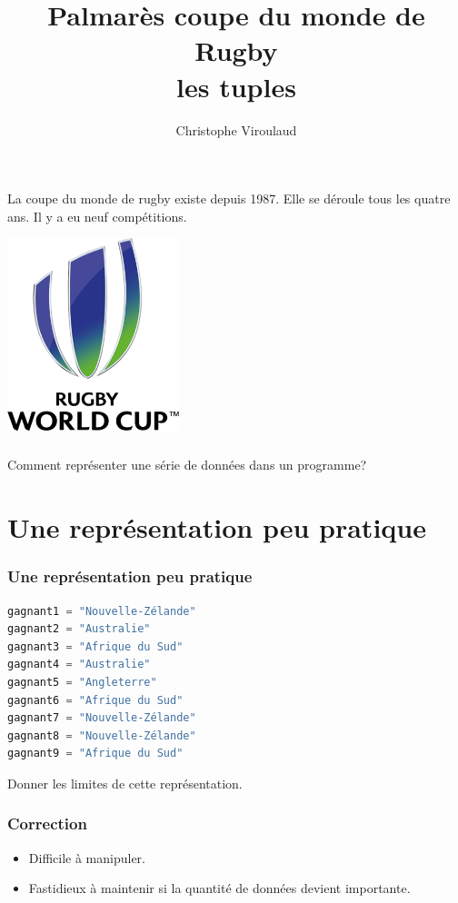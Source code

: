 \documentclass[svgnames,11pt]{beamer}
\author[]{Christophe Viroulaud}
\title{Palmarès coupe du monde de Rugby\\les tuples}
\date{\framebox{\textbf{DonRep 06}}}
\institute{Terminale - NSI}
\begin{document}
\begin{frame}
\titlepage
\end{frame}
\begin{frame}
    \frametitle{}

La coupe du monde de rugby existe depuis 1987. Elle se déroule tous les quatre ans. Il y a eu neuf compétitions.
\begin{center}
\includegraphics[width=5cm]{ressources/rugby.png}
\end{center}

\end{frame}
\begin{frame}
    \frametitle{}

    \begin{framed}
        \centering Comment représenter une série de données dans un programme?
    \end{framed}

\end{frame}
\section{Une représentation peu pratique}
\begin{frame}[fragile]
    \frametitle{Une représentation peu pratique}

\begin{center}
\begin{lstlisting}[language=Python , basicstyle=\ttfamily\small, xleftmargin=2em, xrightmargin=2em]
gagnant1 = "Nouvelle-Zélande"
gagnant2 = "Australie"
gagnant3 = "Afrique du Sud"
gagnant4 = "Australie"
gagnant5 = "Angleterre"
gagnant6 = "Afrique du Sud"
gagnant7 = "Nouvelle-Zélande"
gagnant8 = "Nouvelle-Zélande"
gagnant9 = "Afrique du Sud"
\end{lstlisting}
\label{CODE}
\end{center}   
\begin{activite}
Donner les limites de cette représentation.
\end{activite}
\end{frame}
\begin{frame}
    \frametitle{Correction}

\begin{itemize}
    \item Difficile à manipuler.
    \item Fastidieux à maintenir si la quantité de données devient importante.
\end{itemize}

\end{frame}
\end{document}
